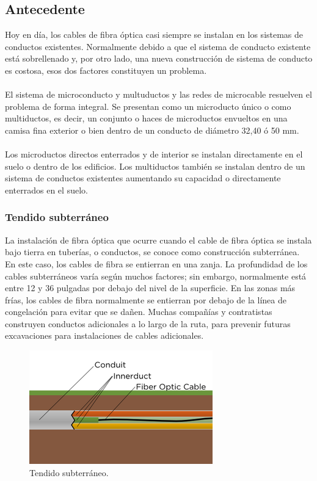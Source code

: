 \documentclass[12pt,letterpaper]{article}
\begin{document}
\subsection{Antecedente}
Hoy en día, los cables de fibra óptica casi siempre se instalan en los sistemas de 
conductos existentes. Normalmente debido a que el sistema de conducto existente está 
sobrellenado y, por otro lado, una nueva construcción de sistema de conducto es costosa, 
esos dos factores constituyen un problema.
\\ \\
El sistema de microconducto y multuductos y las redes de microcable resuelven el problema 
de forma integral. Se presentan como un microducto único o como multiductos, es decir, un 
conjunto o haces de microductos envueltos en una camisa fina exterior o bien dentro de un 
conducto de diámetro 32,40 ó 50 mm.
\\ \\
Los microductos directos enterrados y de interior se instalan directamente en el suelo o 
dentro de los edificios. Los multiductos también se instalan dentro de un sistema de 
conductos existentes aumentando su capacidad o directamente enterrados en el suelo.

\subsubsection{Tendido subterráneo}
La instalación de fibra óptica que ocurre cuando el cable de fibra óptica se instala bajo 
tierra en tuberías, o conductos, se conoce como construcción subterránea. En este caso, los 
cables de fibra se entierran en una zanja. La profundidad de los cables subterráneos varía 
según muchos factores; sin embargo, normalmente está entre 12 y 36 pulgadas por debajo del 
nivel de la superficie. En las zonas más frías, los cables de fibra normalmente se entierran 
por debajo de la línea de congelación para evitar que se dañen. Muchas compañías y 
contratistas construyen conductos adicionales a lo largo de la ruta, para prevenir futuras 
excavaciones para instalaciones de cables adicionales.
\begin{figure}[ht]
    \centering
    \includegraphics[width=.5\textwidth]{f11.png}
    \caption{Tendido subterráneo.}
\end{figure}
\end{document}
